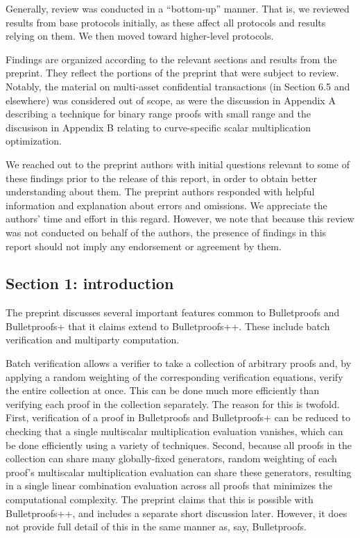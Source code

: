 \documentclass{article}
\begin{document}
Generally, review was conducted in a ``bottom-up'' manner.
That is, we reviewed results from base protocols initially, as these affect all protocols and results relying on them.
We then moved toward higher-level protocols.

Findings are organized according to the relevant sections and results from the preprint.
They reflect the portions of the preprint that were subject to review.
Notably, the material on multi-asset confidential transactions (in Section 6.5 and elsewhere) was considered out of scope, as were the discussion in Appendix A describing a technique for binary range proofs with small range and the discusison in Appendix B relating to curve-specific scalar multiplication optimization.

We reached out to the preprint authors with initial questions relevant to some of these findings prior to the release of this report, in order to obtain better understanding about them.
The preprint authors responded with helpful information and explanation about errors and omissions.
We appreciate the authors' time and effort in this regard.
However, we note that because this review was not conducted on behalf of the authors, the presence of findings in this report should not imply any endorsement or agreement by them.


\subsection{Section 1: introduction}

The preprint discusses several important features common to Bulletproofs and Bulletproofs+ that it claims extend to Bulletproofs++.
These include batch verification and multiparty computation.

Batch verification allows a verifier to take a collection of arbitrary proofs and, by applying a random weighting of the corresponding verification equations, verify the entire collection at once.
This can be done much more efficiently than verifying each proof in the collection separately.
The reason for this is twofold.
First, verification of a proof in Bulletproofs and Bulletproofs+ can be reduced to checking that a single multiscalar multiplication evaluation vanishes, which can be done efficiently using a variety of techniques.
Second, because all proofs in the collection can share many globally-fixed generators, random weighting of each proof's multiscalar multiplication evaluation can share these generators, resulting in a single linear combination evaluation across all proofs that minimizes the computational complexity.
The preprint claims that this is possible with Bulletproofs++, and includes a separate short discussion later.
However, it does not provide full detail of this in the same manner as, say, Bulletproofs.
\end{document}
